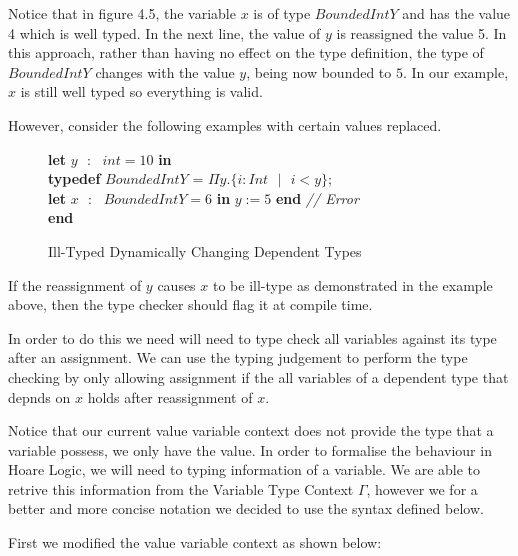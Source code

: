 \documentclass[a4paper,12pt]{report}
\newenvironment{tabs}[1]
 {\flushleft\TabPositions{#1}}
 {\endflushleft}
\begin{document}
\par
Notice that in figure 4.5, the variable $x$ is 
of type $BoundedIntY$ and has the value 4 which is well typed. In the next line, 
the value of $y$ is reassigned the value 5. In this approach, rather than having 
no effect on the type definition, the type of $BoundedIntY$ changes with the 
value $y$, being now bounded to $5$. In our example, $x$ is still well typed so 
everything is valid. 


\par
However, consider the following examples with certain values replaced. 

\begin{figure} [H]
  \begin{tabs}{1cm,2cm}
    \textbf{let }$y\text{ }:\text{ } int = 10$ \textbf{ in } \\
    \tab\textbf{typedef }$BoundedIntY$ = $\Pi y. \{i : Int\text{ }|\text{ }i < y\}$; \\ 
    \tab\textbf{let }$x\text{ }:\text{ }BoundedIntY = 6$ \textbf{ in }$y := 5$\textbf { end }\textit{// Error}\\
    \textbf {end}
  \end{tabs}  
  \caption{Ill-Typed Dynamically Changing Dependent Types}
\end{figure}

\par
If the reassignment of $y$ causes $x$ to be ill-type as demonstrated in the 
example above, then the type checker should flag it at compile time. 

\par
In order to do this we need will need to type check all variables against its 
type after an assignment. We can use the typing judgement to perform the 
type checking by only allowing assignment if the all variables of a dependent 
type that depnds on $x$ holds after reassignment of $x$.

\par
Notice that our current value variable context does not 
provide the type that a variable possess, we only have the value. 
In order to formalise the behaviour in Hoare Logic, we will need to typing 
information of a variable. We are able to retrive this information from the 
Variable Type Context $\Gamma$, however we for a better and more concise 
notation we decided to use the syntax defined below.

\par
First we modified the value variable context as shown below:
 
\end{document}

